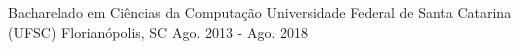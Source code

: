 

\begin{cventries}

  \cventry
    {Bacharelado em Ciências da Computação} %
    {Universidade Federal de Santa Catarina (UFSC)} %
    {Florianópolis, SC} %
    {Ago. 2013 - Ago. 2018} %
    {}


\end{cventries}
